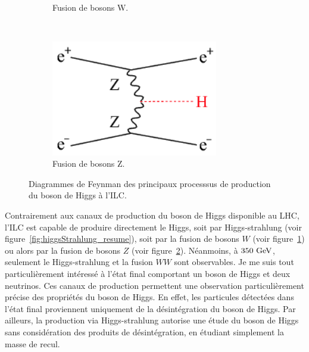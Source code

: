 \begin{figure}
\begin{subfigure}[t]{0.3\textwidth}
            \caption{Fusion de bosons W.}
            \label{fig:WW-fusion_resume}
        \end{subfigure}
        ~%
        \begin{subfigure}[t]{0.3\textwidth}
            \includegraphics[width = 0.8\textwidth]{Pictures/Higgs/HiggsProd_eeH.png}
            \caption{Fusion de bosons Z.}
            \label{fig:ZZ-fusion_resume}
        \end{subfigure}
        \caption{Diagrammes de Feynman des principaux processsus de production du boson de Higgs à l'ILC\cite{Asner2013}\cite{tian}.}
        \label{fig:higgsProduction_resume}
    \end{figure}    

  Contrairement aux canaux de production du boson de Higgs disponible au LHC, l'ILC est capable de produire directement le Higgs, soit par Higgs-strahlung (voir figure~\ref{fig:higgsStrahlung_resume}), soit par la fusion de bosons $W$ (voir figure~\ref{fig:WW-fusion_resume}) ou alors par la fusion de bosons $Z$ (voir figure~\ref{fig:ZZ-fusion_resume}).
  Néanmoins, à $350~\rm{GeV}$, seulement le Higgs-strahlung et la fusion $WW$ sont observables.
  Je me suis tout particulièrement intéressé à l'état final comportant un boson de Higgs et deux neutrinos.
  Ces canaux de production permettent une observation particulièrement précise des propriétés du boson de Higgs. 
  En effet, les particules détectées dans l'état final proviennent uniquement de la désintégration du boson de Higgs. 
  Par ailleurs, la production via Higgs-strahlung autorise une étude du boson de Higgs sans considération des produits de désintégration, en étudiant simplement la masse de recul.
  
